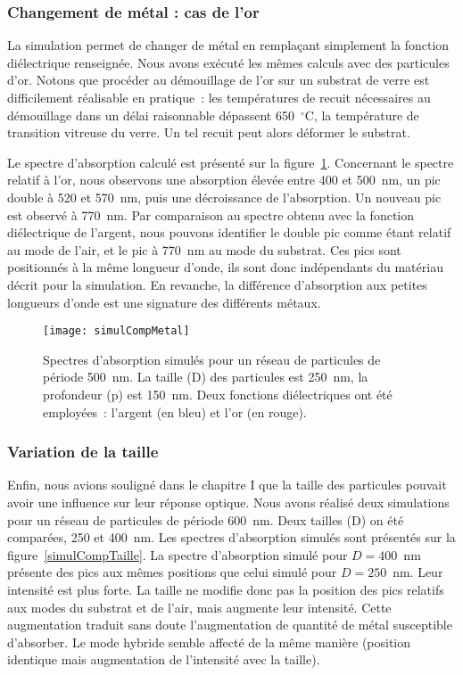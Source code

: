 	\subsubsection{Changement de métal : cas de l'or}
La simulation permet de changer de métal en remplaçant simplement la fonction diélectrique renseignée. Nous avons exécuté les mêmes calculs avec des particules d'or. Notons que procéder au démouillage de l'or sur un substrat de verre est difficilement réalisable en pratique~: les températures de recuit nécessaires au démouillage dans un délai raisonnable dépassent 650~$^\circ$C, la température de transition vitreuse du verre. Un tel recuit peut alors déformer le substrat.\par 
Le spectre d'absorption calculé est présenté sur la figure~\ref{simulCompMetal}. Concernant le spectre relatif à l'or, nous observons une absorption élevée entre 400 et 500~nm, un pic double à 520 et 570~nm, puis une décroissance de l'absorption. Un nouveau pic est observé à 770~nm. Par comparaison au spectre obtenu avec la fonction diélectrique de l'argent, nous pouvons identifier le double pic comme étant relatif au mode de l'air, et le pic à 770~nm au mode du substrat. Ces pics sont positionnés à la même longueur d'onde, ils sont donc indépendants du matériau décrit pour la simulation. En revanche, la différence d'absorption aux petites longueurs d'onde est une signature des différents métaux. \par  
\begin{figure}[!htb]
\centering
\texttt{[image: simulCompMetal]}
\caption{Spectres d'absorption simulés pour un réseau de particules de période 500~nm. La taille (D) des particules est 250~nm, la profondeur (p) est 150~nm. Deux fonctions diélectriques ont été employées~: l'argent (en bleu) et l'or (en rouge).}
\label{simulCompMetal}
\end{figure}

	\subsubsection{Variation de la taille}
Enfin, nous avions souligné dans le chapitre I que la taille des particules pouvait avoir une influence sur leur réponse optique. Nous avons réalisé deux simulations pour un réseau de particules de période 600~nm. Deux tailles (D) on été comparées, 250 et 400~nm. Les spectres d'absorption simulés sont présentés sur la figure~\ref{simulCompTaille}. La spectre d'absorption simulé pour $D = 400$~nm présente des pics aux mêmes positions que celui simulé pour $D = 250$~nm. Leur intensité est plus forte. La taille ne modifie donc pas la position des pics relatifs aux modes du substrat et de l'air, mais augmente leur intensité. Cette augmentation traduit sans doute l'augmentation de quantité de métal susceptible d'absorber. Le mode hybride semble affecté de la même manière (position identique mais augmentation de l'intensité avec la taille).\par 

